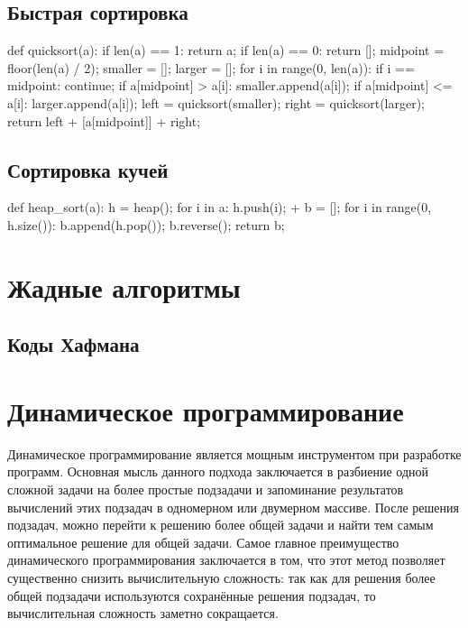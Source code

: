 \subsection{Быстрая сортировка}

\begin{python}
def quicksort(a):
	if len(a) == 1:
		return a;
	if len(a) == 0:
		return [];
	midpoint = floor(len(a) / 2);
	smaller = [];
	larger  = [];
	for i in range(0, len(a)):
		if i == midpoint:
			continue;
		if a[midpoint] > a[i]:
			smaller.append(a[i]);
		if a[midpoint] <= a[i]:
			larger.append(a[i]);
	left = quicksort(smaller);
	right = quicksort(larger);
	return left + [a[midpoint]] + right;
\end{python}

\subsection{Сортировка кучей}

\begin{python}
def heap_sort(a):
	h = heap();
	for i in a:
		h.push(i);
 +	b = [];
	for i in range(0, h.size()):
		b.append(h.pop());
	b.reverse();
	return b;
\end{python}

\section{Жадные алгоритмы}

\subsection{Коды Хафмана}

\section{Динамическое программирование}

Динамическое программирование является мощным инструментом 
при разработке программ. Основная мысль данного подхода заключается 
в разбиение одной сложной задачи на более простые подзадачи и запоминание 
результатов вычислений этих подзадач в одномерном или двумерном массиве. 
После решения подзадач, можно перейти к решению более общей задачи и найти тем 
самым оптимальное решение для общей задачи. Самое главное преимущество динамического
программирования заключается в том, что этот метод позволяет существенно снизить 
вычислительную сложность: так как для решения более общей подзадачи используются
сохранённые решения подзадач, то вычислительная сложность заметно сокращается. 

